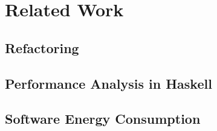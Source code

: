 \chapter{Related Work}\label{chp:related}

\section{Refactoring}
\lipsum[1-3]


\section{Performance Analysis in Haskell}
\lipsum[1-3]


\section{Software Energy Consumption}
\lipsum[1-3]
